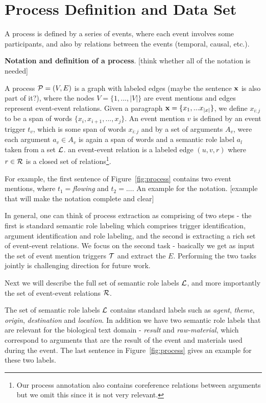 \section{Process Definition and Data Set}

A process is defined by a series of events, where each event involves some participants, and also by relations between the events (temporal, causal, etc.). 

\textbf{Notation and definition of a process}. [think whether all of the notation is needed]

A process $\mathcal{P}=(V,E)$ is a graph with labeled edges (maybe the sentence $\mathbf{x}$ is also part of it?), where the nodes $V=\{1,...,|V|\}$ are event mentions and edges represent event-event relations. Given a paragraph $\mathbf{x}=\{x_1,...x_{|x|}\}$, we define $x_{i:j}$ to be a span of words $\{x_i,x_{i+1},...,x_j\}$. An event mention $v$ is defined by an event trigger $t_v$, which is some span of words $x_{i:j}$ and by a set of arguments $A_v$, were each argument $a_v \in A_v$ is again a span of words and a semantic role label $a_l$ taken from a set $\mathcal{L}$. an event-event relation is a labeled edge $(u,v,r)$ where $r \in \mathcal{R}$ is a closed set of relations\footnote{Our process annotation also contains coreference relations between arguments but we omit this since it is not very relevant.}.

For example, the first sentence of Figure~\ref{fig:process} contains two event mentions, where $t_1=$\emph{flowing} and $t_2=$.... An example for the notation. [example that will make the notation complete and clear]

In general, one can think of process extraction as comprising of two steps - the first is standard semantic role labeling which comprises trigger identification, argument identification and role labeling, and the second is extracting a rich set of event-event relations. We focus on the second task - basically we get as input the set of event mention triggers $\mathcal{T}$ and extract the $E$. Performing the two tasks jointly is challenging direction for future work.

Next we will describe the full set of semantic role labels $\mathcal{L}$, and more importantly the set of event-event relations $\mathcal{R}$.

The set of semantic role labels $\mathcal{L}$ contains standard labels such as \emph{agent}, \emph{theme}, \emph{origin}, \emph{destination} and \emph{location}. In addition we have two semantic role labels that are relevant for the biological text domain - \emph{result} and \emph{raw-material}, which correspond to arguments that are the result of the event and materials used during the event. The last sentence in Figure~\ref{fig:process} gives an example for these two labels.

